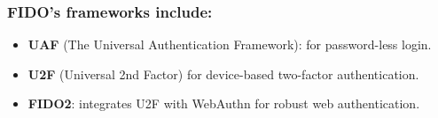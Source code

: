 \subsubsection{FIDO's frameworks include:}
\begin{itemize}
    \item \textbf{UAF} (The Universal Authentication Framework): for password-less login.
    \item \textbf{U2F} (Universal 2nd Factor) for device-based two-factor authentication.
    \item \textbf{FIDO2}: integrates U2F with WebAuthn for robust web authentication.
\end{itemize}























